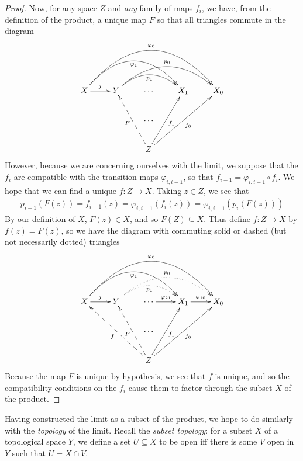 \begin{claim}
\begin{proof}
            Now, for any space $Z$ and \emph{any} family of maps $f_i$, we have, from the definition of the product, a unique map $F$ so that all triangles commute in the diagram
            \begin{displaymath}
              \xymatrix{
                X \ar[r]^j \ar@/^37pt/[rrr]_{\varphi_1} \ar@/^50pt/[rrrr]^{\varphi_0}
                & Y \ar@/^20pt/[rr]_{p_1} \ar@/^30pt/[rrr]^{p_0}
                & \cdots
                & X_1
                & X_0
                \\ && \cdots \\
                && Z \ar@{-->}[uul]^F \ar[uur]_{f_1} \ar[uurr]_{f_0}
              }
            \end{displaymath}
            However, because we are concerning ourselves with the limit, we suppose that the $f_i$ are compatible with the transition maps $\varphi_{i,i-1}$, so that $f_{i-1} = \varphi_{i,i-1}\circ f_i$.
            We hope that we can find a unique $f:Z\rightarrow X$.
            Taking $z\in Z$, we see that
            \begin{align*}
              p_{i-1}(F(z)) = f_{i-1}(z) = \varphi_{i,i-1}(f_i(z)) = \varphi_{i,i-1}(p_i(F(z)))
            \end{align*}
            By our definition of $X$, $F(z)\in X$, and so $F(Z)\subseteq X$.
            Thus define $f:Z\rightarrow X$ by $f(z) = F(z)$, so we have the diagram with commuting solid or dashed (but not necessarily dotted) triangles
            \begin{displaymath}
              \xymatrix{
                X \ar[r]^j \ar@/^37pt/[rrr]_{\varphi_1} \ar@/^50pt/[rrrr]^{\varphi_0}
                & Y \ar@/^20pt/@{..>}[rr]_{p_1} \ar@/^30pt/@{..>}[rrr]^{p_0}
                & \cdots \ar[r]^{\varphi_{21}}
                & X_1 \ar[r]^{\varphi_{10}}
                & X_0
                \\ && \cdots \\
                && Z \ar@{-->}[uull]^f \ar@{-->}[uul]^F \ar[uur]_{f_1} \ar[uurr]_{f_0}
              }
            \end{displaymath}
            Because the map $F$ is unique by hypothesis, we see that $f$ is unique, and so the compatibility conditions on the $f_i$ cause them to factor through the subset $X$ of the product.
          \end{proof}
        \end{claim}

        Having constructed the limit as a subset of the product, we hope to do similarly with the \emph{topology} of the limit.
        Recall the \emph{subset topology}: for a subset $X$ of a topological space $Y$, we define a set $U\subseteq X$ to be open iff there is some $V$ open in $Y$ such that $U=X\cap V$.

